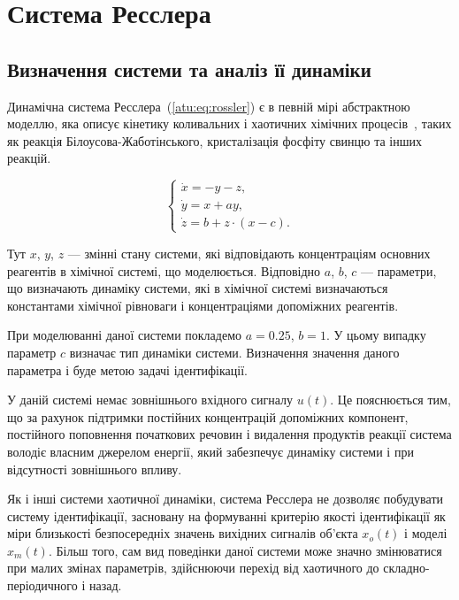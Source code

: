 
\FloatBarrier
\section{Система Ресслера} %
\label{atu:sect:ross}


\subsection{Визначення системи та аналіз її динаміки} %

Динамічна система Ресслера~(\ref{atu:eq:rossler}) є в певній мірі
абстрактною моделлю, яка описує кінетику коливальних і
хаотичних хімічних процесів~\cite{ROSSLER1976397, neimark_stoch_chaos_vibro,koltsova_nl_dyn_chem,berje_order_in_chaos,chulichkcov_mm_ml_dyn, puhov_ur_reaction_diffusion},
таких як реакція Білоусова-Жаботінського, кристалізація фосфіту свинцю
та інших реакцій.

\begin{equation}
\begin{cases}
  \dot{x}  = -y - z  ,  \\
  \dot{y}  = x + a y ,\\
  \dot{z}  = b + z \cdot ( x-c ) .
\end{cases}
\label{atu:eq:rossler}
\end{equation}

Тут \(x\), \(y\), \(z\) --- змінні стану системи, які відповідають
концентраціям основних реагентів в хімічної
системі, що моделюється.
Відповідно \(a\), \(b\), \(c\) --- параметри, що визначають
динаміку системи, які в хімічної системі визначаються
константами хімічної рівноваги і концентраціями допоміжних реагентів.

При моделюванні даної системи покладемо \(a = 0.25 \), \(b = 1 \). У цьому
випадку параметр \(c \) визначає тип динаміки системи. Визначення
значення даного параметра і буде метою задачі ідентифікації.

У даній системі немає зовнішнього вхідного сигналу \(u (t) \). Це
пояснюється тим, що за рахунок підтримки постійних концентрацій
допоміжних компонент, постійного поповнення початкових речовин і
видалення продуктів реакції система володіє власним джерелом
енергії, який забезпечує динаміку системи і при відсутності
зовнішнього впливу.

Як і інші системи хаотичної динаміки, система Ресслера не
дозволяє побудувати систему ідентифікації, засновану на
формуванні критерію якості ідентифікації як міри близькості
безпосередніх значень вихідних сигналів об'єкта \(x_o (t) \) і моделі
\(x_m (t) \). Більш того, сам вид поведінки даної системи може значно
змінюватися при малих змінах параметрів, здійснюючи перехід
від хаотичного до складно-періодичного і назад.

